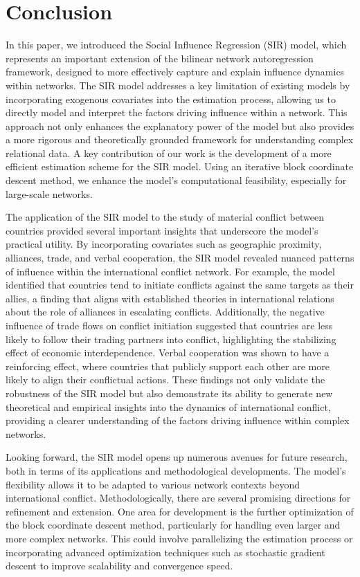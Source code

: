 \section*{\textbf{Conclusion}}

In this paper, we introduced the Social Influence Regression (SIR) model, which represents an important extension of the bilinear network autoregression framework, designed to more effectively capture and explain influence dynamics within networks. The SIR model addresses a key limitation of existing models by incorporating exogenous covariates into the estimation process, allowing us to directly model and interpret the factors driving influence within a network. This approach not only enhances the explanatory power of the model but also provides a more rigorous and theoretically grounded framework for understanding complex relational data. A key contribution of our work is the development of a more efficient estimation scheme for the SIR model. Using an iterative block coordinate descent method, we enhance the model's computational feasibility, especially for large-scale networks. 

The application of the SIR model to the study of material conflict between countries provided several important insights that underscore the model's practical utility. By incorporating covariates such as geographic proximity, alliances, trade, and verbal cooperation, the SIR model revealed nuanced patterns of influence within the international conflict network. For example, the model identified that countries tend to initiate conflicts against the same targets as their allies, a finding that aligns with established theories in international relations about the role of alliances in escalating conflicts. Additionally, the negative influence of trade flows on conflict initiation suggested that countries are less likely to follow their trading partners into conflict, highlighting the stabilizing effect of economic interdependence. Verbal cooperation was shown to have a reinforcing effect, where countries that publicly support each other are more likely to align their conflictual actions. These findings not only validate the robustness of the SIR model but also demonstrate its ability to generate new theoretical and empirical insights into the dynamics of international conflict, providing a clearer understanding of the factors driving influence within complex networks.

Looking forward, the SIR model opens up numerous avenues for future research, both in terms of its applications and methodological developments. The model's flexibility allows it to be adapted to various network contexts beyond international conflict. Methodologically, there are several promising directions for refinement and extension. One area for development is the further optimization of the block coordinate descent method, particularly for handling even larger and more complex networks. This could involve parallelizing the estimation process or incorporating advanced optimization techniques such as stochastic gradient descent to improve scalability and convergence speed.

